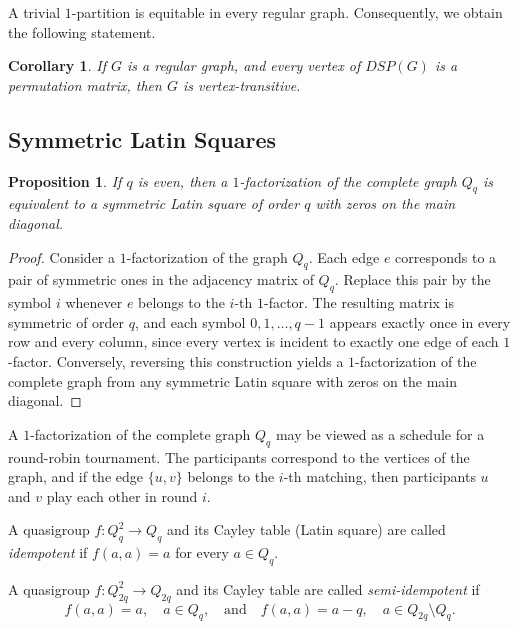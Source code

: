 \documentclass[11pt]{article}
\newtheorem{claim}{Proposition}[section]
\newtheorem{corollary}{Corollary}[section]
\theoremstyle{definition}
\begin{document}
{{{A trivial $1$-partition is equitable in every regular graph.  Consequently, we obtain the  following statement. 
\begin{corollary}
If $G$ is a
regular graph,  and  every vertex of $DSP(G)$ is a permutation matrix, then  $G$ is vertex-transitive.
\end{corollary}




\subsection{Symmetric Latin Squares}


\begin{claim}
If $q$ is even, then a $1$-factorization of the complete graph $Q_q$
is equivalent to a symmetric Latin square of order $q$ with zeros on
the main diagonal.
\end{claim}

\begin{proof}
Consider a $1$-factorization of the graph $Q_q$.
Each edge $e$ corresponds to a pair of symmetric ones in the adjacency
matrix of $Q_q$.
Replace this pair by the symbol $i$ whenever $e$ belongs to the
$i$-th $1$-factor.
The resulting matrix is symmetric of order $q$, and each symbol
$0,1,\ldots,q-1$ appears exactly once in every row and every column,
since every vertex is incident to exactly one edge of each
$1$-factor.
Conversely, reversing this construction yields a $1$-factorization of
the complete graph from any symmetric Latin square with zeros on the
main diagonal.
\end{proof}

A $1$-factorization of the complete graph $Q_q$ may be viewed as a
schedule for a round-robin tournament.
The participants correspond to the vertices of the graph, and if the
edge $\{u,v\}$ belongs to the $i$-th matching, then participants $u$
and $v$ play each other in round $i$.

A quasigroup $f:Q_q^2\rightarrow Q_q$ and its Cayley table (Latin
square) are called {\sl idempotent} if
$f(a,a)=a$
for every $a\in Q_q$.

A quasigroup
$f:Q_{2q}^2\rightarrow Q_{2q}$
and its Cayley table are called {\sl semi-idempotent} if
\[
f(a,a)=a,\quad a\in Q_q,\quad
\mbox{and}\quad
f(a,a)=a-q,\quad
a\in Q_{2q}\setminus Q_q.
\]

}}}
\end{document}
